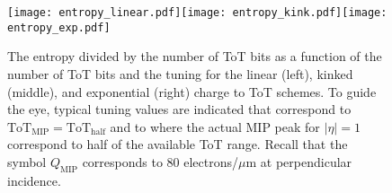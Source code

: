 \documentclass[12pt]{article}
\begin{document}

\begin{figure}[h!]
\centering
\texttt{[image: entropy\_linear.pdf]}\texttt{[image: entropy\_kink.pdf]}\texttt{[image: entropy\_exp.pdf]}
\caption{The entropy divided by the number of ToT bits as a function of the number of ToT bits and the tuning for the linear (left), kinked (middle), and exponential (right) charge to ToT schemes. To guide the eye, typical tuning values are indicated that correspond to $\text{ToT}_\text{MIP}=\text{ToT}_\text{half}$ and to where the actual MIP peak for $|\eta|=1$ correspond to half of the available ToT range.  Recall that the symbol $Q_\text{MIP}$ corresponds to 80 electrons/$\mu$m at perpendicular incidence.}
\label{fig:efficiency:entropy}
\end{figure}

\end{document}

